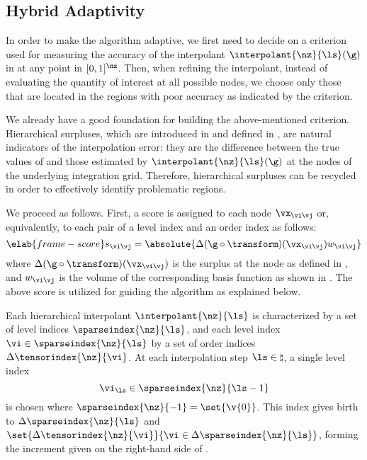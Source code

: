 \subsection{Hybrid Adaptivity}

In order to make the algorithm adaptive, we first need to decide on a criterion
used for measuring the accuracy of the interpolant $\interpolant{\nz}{\ls}(\g)$
in  at any point in $[0, 1]^\nz$. Then, when refining
the interpolant, instead of evaluating the quantity of interest \g at all
possible nodes, we choose only those that are located in the regions with poor
accuracy as indicated by the criterion.

We already have a good foundation for building the above-mentioned criterion.
Hierarchical surpluses, which are introduced in
 and defined in
, are natural indicators of the interpolation
error: they are the difference between the true values of \g and those estimated
by $\interpolant{\nz}{\ls}(\g)$ at the nodes of the underlying integration grid.
Therefore, hierarchical surpluses can be recycled in order to effectively
identify problematic regions.

We proceed as follows. First, a score is assigned to each node $\vx_{\vi \vj}$
or, equivalently, to each pair of a level index \vi and an order index \vj as
follows:
\begin{equation} \elab{frame-score}
  s_{\vi \vj} = \absolute{\Delta(\g \circ \transform)(\vx_{\vi \vj}) w_{\vi \vj}}
\end{equation}
where $\Delta(\g \circ \transform)(\vx_{\vi \vj})$ is the surplus at the node as
defined in , and $w_{\vi \vj}$ is the volume of
the corresponding basis function as shown in . The above
score is utilized for guiding the algorithm as explained below.

Each hierarchical interpolant $\interpolant{\nz}{\ls}$ is characterized by a set
of level indices $\sparseindex{\nz}{\ls}$, and each level index $\vi \in
\sparseindex{\nz}{\ls}$ by a set of order indices
$\Delta\tensorindex{\nz}{\vi}$. At each interpolation step $\ls \in \natural$, a
single level index
\[
  \vi_{\ls} \in \sparseindex{\nz}{\ls - 1}
\]
is chosen where $\sparseindex{\nz}{-1} = \set{\v{0}}$. This index gives birth to
$\Delta\sparseindex{\nz}{\ls}$ and $\set{\Delta\tensorindex{\nz}{\vi}}{\vi \in
\Delta\sparseindex{\nz}{\ls}}$, forming the increment given on the right-hand
side of .

